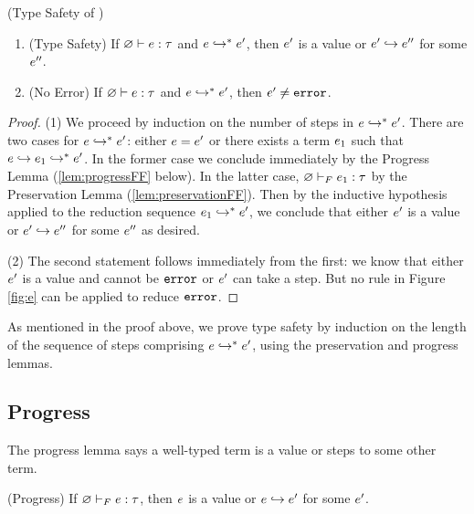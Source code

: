 \begin{theorem} (Type Safety of \sysf) 
  \label{lem:soundnessF} %
  \begin{enumerate}
      \item (Type Safety)
      If ${\varnothing} \vdash {\ensuremath{e}} : {\tau}$ and ${e} \hookrightarrow^{*} {e'}$,
      then $e'$ is a value or $e' \hookrightarrow e''$
      for some $e''$.
      \item (No Error)
      If ${\varnothing} \vdash {\ensuremath{e}} : {\tau}$ and ${e} \hookrightarrow^{*} {e'}$,
      then $e' \not = \texttt{error}$.
  \end{enumerate}
  \end{theorem}
\begin{proof}
  (1) 
  We proceed by induction on the number of steps in 
  ${e} \hookrightarrow^{*} {e'}$.
  There are two cases for ${e} \hookrightarrow^{*} {e'}$: 
  either $e=e'$ 
  or there exists a term $e_1$ 
  such that $\sexpr \step \evalsTo{\sexpr_1}{\sexpr'}$.
  In the former case we conclude immediately 
  by the Progress Lemma (\ref{lem:progressFF} below).
  In the latter case, ${\varnothing} \vdash_F {e_1} : {\tau}$
  by the Preservation Lemma (\ref{lem:preservationFF}). 
  Then by the inductive hypothesis
  applied to the reduction sequence ${e_1} \hookrightarrow^{*} {e'}$, 
  we conclude that either $e'$ is a value 
  or $e' \hookrightarrow e''$ for some $e''$ as desired. 

  (2) The second statement follows immediately from the first:
  we know that either $e'$ is a value and cannot be $\texttt{error}$
  or $e'$ can take a step. But no rule in Figure \ref{fig:e}
  can be applied to reduce $\texttt{error}$.
\end{proof}
As mentioned in the proof above,
we prove type safety by induction on the 
length of the sequence of steps comprising 
${e} \hookrightarrow^{*} {e'}$, using the 
preservation and progress lemmas.

\subsection{Progress} \label{sec:sysf:progressF}
%
The progress lemma says a well-typed term is a value 
or steps to some other term.
%
\begin{lemma} (Progress) \label{lem:progressFF} 
If ${\varnothing} \vdash_F {e} : {\tau}$, 
then $e$ is a value or $e \hookrightarrow e'$ for some $e'$.
\end{lemma}

